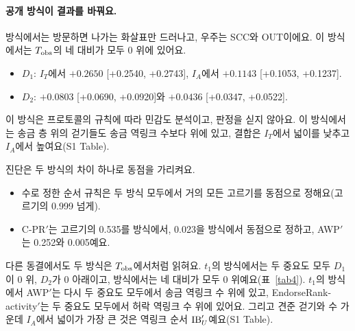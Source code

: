 \paragraph{공개 방식이 결과를 바꿔요.}
\outm{} 방식에서는 방문하면 나가는 화살표만 드러나고, 우주는 SCC와 OUT이에요. 이 방식에서는 $T_{\mathrm{obs}}$의 네 대비가 모두 0 위에 있어요.
\begin{itemize}
\item $D_1$: $I_T$에서 $+0.2650$ [+0.2540, +0.2743], $I_A$에서 $+0.1143$ [+0.1053, +0.1237].
\item $D_2$: $+0.0803$ [+0.0690, +0.0920]와 $+0.0436$ [+0.0347, +0.0522].
\end{itemize}
이 방식은 프로토콜의 규칙에 따라 민감도 분석이고, 판정을 싣지 않아요. 이 방식에서는 송금 층 위의 걷기들도 송금 역링크 수보다 위에 있고, 결합은 $I_T$에서 넓이를 낮추고 $I_A$에서 높여요(S1 Table).

진단은 두 방식의 차이 하나로 동점을 가리켜요.
\begin{itemize}
\item 수로 정한 순서 규칙은 두 방식 모두에서 거의 모든 고르기를 동점으로 정해요(고르기의 0.999 넘게).
\item C-PR$'$는 고르기의 0.535를 \both{} 방식에서, 0.023을 \outm{} 방식에서 동점으로 정하고, AWP$'$는 0.252와 0.005예요.
\end{itemize}
다른 동결에서도 두 방식은 $T_{\mathrm{obs}}$에서처럼 읽혀요. $t_1$의 \both{} 방식에서는 두 중요도 모두 $D_1$이 0 위, $D_2$가 0 아래이고, \outm{} 방식에서는 네 대비가 모두 0 위예요(표~\ref{tab4}). $t_1$의 \both{} 방식에서 AWP$'$는 다시 두 중요도 모두에서 송금 역링크 수 위에 있고, EndorseRank-activity$'$는 두 중요도 모두에서 허락 역링크 수 위에 있어요. 그리고 견준 걷기와 수 가운데 $I_A$에서 넓이가 가장 큰 것은 역링크 순서 $\mathrm{IB}'_U$예요(S1 Table).


